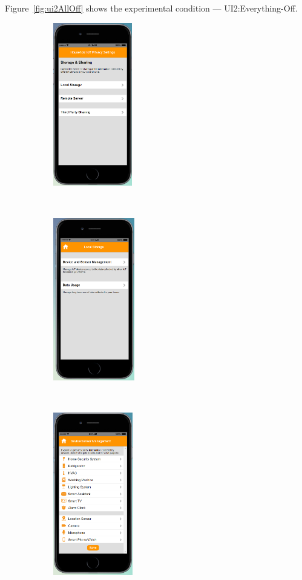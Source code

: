 \begin{appendices}
Figure~\ref{fig:ui2AllOff} shows the experimental condition --- UI2:Everything-Off.
\begin{figure}
	\centering
	\begin{subfigure}[t]{0.2\textwidth}
		\centering
		\includegraphics[height=2.8in]{figures/ui2allOff1.png}
	\end{subfigure}%
	~~~~~
	\begin{subfigure}[t]{0.2\textwidth}
		\centering
		\includegraphics[height=2.8in]{figures/ui2allOffLocal.png}
	\end{subfigure}%
	~~~~~
	\begin{subfigure}[t]{0.2\textwidth}
		\centering
		\includegraphics[height=2.8in]{figures/ui2allOff2.png}

\end{subfigure}
\end{figure}
\end{appendices}
